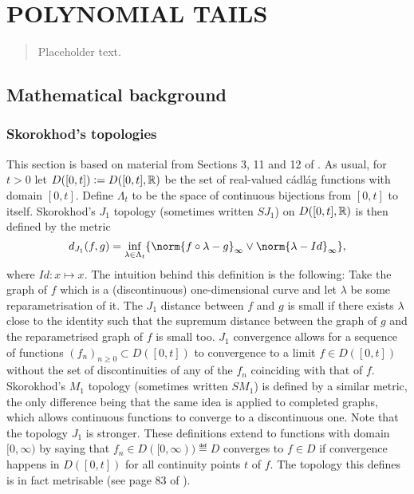 \section{POLYNOMIAL TAILS}\label{sec:poly}

\begin{quote}
{\small Placeholder text. }
\end{quote}

\subsection{Mathematical background}
\subsubsection{Skorokhod's topologies}
This section is based on material from Sections 3, 11 and 12 of \cite{jacod2013limit}. As usual, for $t > 0$ let $D([0, t]) \vcentcolon= D([0, t], \mathbb{R})$ be the set of real-valued cádlág functions with domain $[0, t]$. Define $\Lambda_t$ to be the space of continuous bijections from $[0,t]$ to itself. Skorokhod's $J_1$ topology (sometimes written $SJ_1$) on $D([0,t], \mathbb{R})$ is then defined by the metric 
\begin{equation}
d_{J_1}(f,g) = \inf_{\lambda \in \Lambda_t} \{ \norm{f \circ \lambda - g}_{\infty} \lor \norm{\lambda - Id}_{\infty} \}, 
\end{equation}
where $Id : x \mapsto x$. The intuition behind this definition is the following: Take the graph of $f$ which is a (discontinuous) one-dimensional curve and let $\lambda$ be some reparametrisation of it. The $J_1$ distance between $f$ and $g$ is small if there exists $\lambda$ close to the identity such that the supremum distance between the graph of $g$ and the reparametrised graph of $f$ is small too. $J_1$ convergence allows for a sequence of functions $(f_n)_{n \geq 0} \subset D([0, t])$ to convergence to a limit $f\in D([0, t])$ without the set of discontinuities of any of the $f_n$ coinciding with that of $f$. Skorokhod's $M_1$ topology (sometimes written $SM_1$) is defined by a similar metric, the only difference being that the same idea is applied to completed graphs, which allows continuous functions to converge to a discontinuous one. Note that the topology $J_1$ is stronger. These definitions extend to functions with domain $[0, \infty)$ by saying that $f_n \in D([0, \infty)) \eqdef D$ converges to $f \in D$ if convergence happens in $D([0, t])$ for all continuity points $t$ of $f$. The topology this defines is in fact metrisable (see page 83 of \cite{jacod2013limit}). \\

